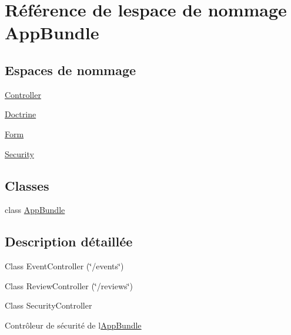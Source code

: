 \hypertarget{namespaceAppBundle}{}\section{Référence de l\textquotesingle{}espace de nommage App\+Bundle}
\label{namespaceAppBundle}
\subsection*{Espaces de nommage}
\begin{DoxyCompactItemize}
\item 
 \hyperlink{namespaceAppBundle_1_1Controller}{Controller}
\item 
 \hyperlink{namespaceAppBundle_1_1Doctrine}{Doctrine}
\item 
 \hyperlink{namespaceAppBundle_1_1Form}{Form}
\item 
 \hyperlink{namespaceAppBundle_1_1Security}{Security}
\end{DoxyCompactItemize}
\subsection*{Classes}
\begin{DoxyCompactItemize}
\item 
class \hyperlink{classAppBundle_1_1AppBundle}{App\+Bundle}
\end{DoxyCompactItemize}


\subsection{Description détaillée}
Class Event\+Controller  (\char`\"{}/events\char`\"{})

Class Review\+Controller  (\char`\"{}/reviews\char`\"{})

Class Security\+Controller

Contrôleur de sécurité de l\textquotesingle{}\hyperlink{namespaceAppBundle}{App\+Bundle}
